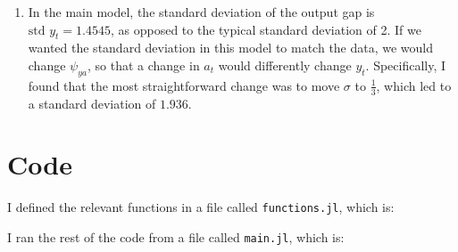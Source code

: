 \documentclass[10pt]{article}
\begin{document}
\begin{enumerate}
	\item In the main model, the standard deviation of the output gap is $\text{std }y_t = 1.4545$, as opposed to the typical standard deviation of 2. If we wanted the standard deviation in this model to match the data, we would change $\psi_{ya}$, so that a change in $a_t$ would differently change $y_t$. Specifically, I found that the most straightforward change was to move $\sigma$ to $\frac{1}{3}$, which led to a standard deviation of $1.936$.
\end{enumerate}



\newpage
\section*{Code}\label{code}

I defined the relevant functions in a file called \texttt{functions.jl}, which is:



\newpage
I ran the rest of the code from a file called \texttt{main.jl}, which is:


\end{document}
